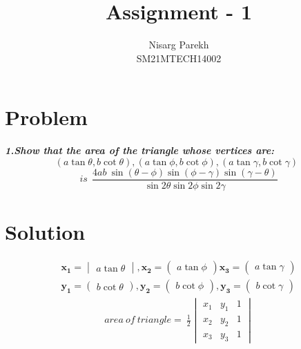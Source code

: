 \documentclass[journal,12pt,twocolumn]{IEEEtran}
\begin{document}
\providecommand{\sbrak}[1]{\ensuremath{{}\left[#1\right]}}
\providecommand{\lsbrak}[1]{\ensuremath{{}\left[#1\right.}}
\providecommand{\rsbrak}[1]{\ensuremath{{}\left.#1\right]}}
\providecommand{\brak}[1]{\ensuremath{\left(#1\right)}}
\providecommand{\lbrak}[1]{\ensuremath{\left(#1\right.}}
\providecommand{\rbrak}[1]{\ensuremath{\left.#1\right)}}
\providecommand{\cbrak}[1]{\ensuremath{\left\{#1\right\}}}
\providecommand{\lcbrak}[1]{\ensuremath{\left\{#1\right.}}
\providecommand{\rcbrak}[1]{\ensuremath{\left.#1\right\}}}
\newcommand{\myvec}[1]{\ensuremath{\begin{pmatrix}#1\end{pmatrix}}}
\newcommand{\cmyvec}[1]{\ensuremath{\begin{pmatrix*}[c]#1\end{pmatrix*}}}
\newcommand{\mydet}[1]{\ensuremath{\begin{vmatrix}#1\end{vmatrix}}}
\newcommand{\proj}[2]{\textbf{proj}_{\vec{#1}}\vec{#2}}
\let\StandardTheFigure\thefigure
\let\vec\mathbf

\title{
Assignment - 1
}
\author{ Nisarg Parekh \\SM21MTECH14002}
\maketitle
\newpage
\bigskip

\section*{\textbf{Problem}}
\noindent
\textbf{\textsl{1.Show that the area of the triangle whose vertices are:
$$(a \tan\theta, b\cot\theta),(a \tan \phi, b\cot \phi),(a \tan \gamma, b\cot \gamma)~~$$
$$ is~~  \frac{4ab~\sin(\theta-\phi)\sin(\phi-\gamma)\sin(\gamma-\theta)}{\sin2\theta\sin2\phi\sin2\gamma}$$ }}
\noindent
\section*{\textbf{Solution}}
\noindent
\begin{align*}
 \vec{x_1} = \mydet{a\tan\theta}, \vec{x_2} = \myvec{a\tan\phi}
\vec{x_3}=\myvec{a\tan\gamma}\\\vec{y_1}=\myvec{b\cot\theta},\vec{y_2}=\myvec{b\cot\phi},\vec{y_3}=\myvec{b\cot\gamma}\end{align*}
\begin{multline}
area~ of ~triangle=~\frac{1}{2} \mydet{
 x_{1} & y_{1} & 1  \\ 
 x_{2} & y_{2} & 1  \\
 x_{3} & y_{3} & 1 
}\end{multline}
\end{document}
